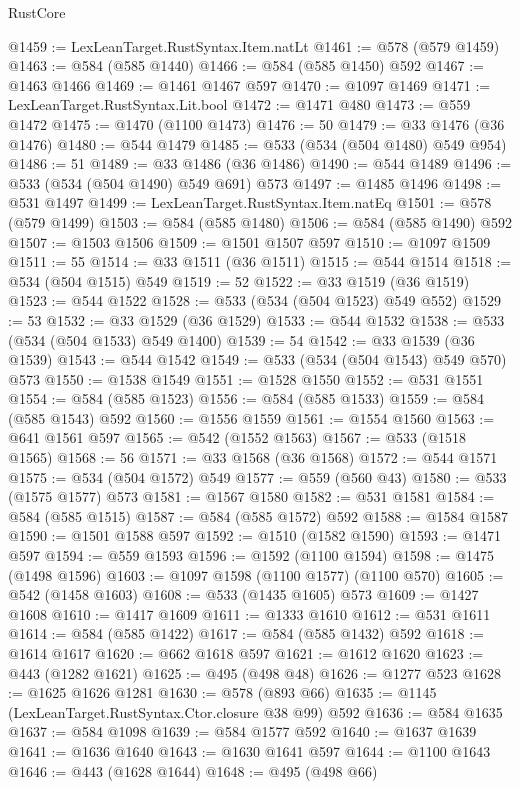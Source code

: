 \begin{lexlean}{RustCore}
\begin{coremodule}
@1459 := LexLeanTarget.RustSyntax.Item.natLt
@1461 := @578 (@579 @1459)
@1463 := @584 (@585 @1440)
@1466 := @584 (@585 @1450) @592
@1467 := @1463 @1466
@1469 := @1461 @1467 @597
@1470 := @1097 @1469
@1471 := LexLeanTarget.RustSyntax.Lit.bool
@1472 := @1471 @480
@1473 := @559 @1472
@1475 := @1470 (@1100 @1473)
@1476 := 50
@1479 := @33 @1476 (@36 @1476)
@1480 := @544 @1479
@1485 := @533 (@534 (@504 @1480) @549 @954)
@1486 := 51
@1489 := @33 @1486 (@36 @1486)
@1490 := @544 @1489
@1496 := @533 (@534 (@504 @1490) @549 @691) @573
@1497 := @1485 @1496
@1498 := @531 @1497
@1499 := LexLeanTarget.RustSyntax.Item.natEq
@1501 := @578 (@579 @1499)
@1503 := @584 (@585 @1480)
@1506 := @584 (@585 @1490) @592
@1507 := @1503 @1506
@1509 := @1501 @1507 @597
@1510 := @1097 @1509
@1511 := 55
@1514 := @33 @1511 (@36 @1511)
@1515 := @544 @1514
@1518 := @534 (@504 @1515) @549
@1519 := 52
@1522 := @33 @1519 (@36 @1519)
@1523 := @544 @1522
@1528 := @533 (@534 (@504 @1523) @549 @552)
@1529 := 53
@1532 := @33 @1529 (@36 @1529)
@1533 := @544 @1532
@1538 := @533 (@534 (@504 @1533) @549 @1400)
@1539 := 54
@1542 := @33 @1539 (@36 @1539)
@1543 := @544 @1542
@1549 := @533 (@534 (@504 @1543) @549 @570) @573
@1550 := @1538 @1549
@1551 := @1528 @1550
@1552 := @531 @1551
@1554 := @584 (@585 @1523)
@1556 := @584 (@585 @1533)
@1559 := @584 (@585 @1543) @592
@1560 := @1556 @1559
@1561 := @1554 @1560
@1563 := @641 @1561 @597
@1565 := @542 (@1552 @1563)
@1567 := @533 (@1518 @1565)
@1568 := 56
@1571 := @33 @1568 (@36 @1568)
@1572 := @544 @1571
@1575 := @534 (@504 @1572) @549
@1577 := @559 (@560 @43)
@1580 := @533 (@1575 @1577) @573
@1581 := @1567 @1580
@1582 := @531 @1581
@1584 := @584 (@585 @1515)
@1587 := @584 (@585 @1572) @592
@1588 := @1584 @1587
@1590 := @1501 @1588 @597
@1592 := @1510 (@1582 @1590)
@1593 := @1471 @597
@1594 := @559 @1593
@1596 := @1592 (@1100 @1594)
@1598 := @1475 (@1498 @1596)
@1603 := @1097 @1598 (@1100 @1577) (@1100 @570)
@1605 := @542 (@1458 @1603)
@1608 := @533 (@1435 @1605) @573
@1609 := @1427 @1608
@1610 := @1417 @1609
@1611 := @1333 @1610
@1612 := @531 @1611
@1614 := @584 (@585 @1422)
@1617 := @584 (@585 @1432) @592
@1618 := @1614 @1617
@1620 := @662 @1618 @597
@1621 := @1612 @1620
@1623 := @443 (@1282 @1621)
@1625 := @495 (@498 @48)
@1626 := @1277 @523
@1628 := @1625 @1626 @1281
@1630 := @578 (@893 @66)
@1635 := @1145 (LexLeanTarget.RustSyntax.Ctor.closure @38 @99) @592
@1636 := @584 @1635
@1637 := @584 @1098
@1639 := @584 @1577 @592
@1640 := @1637 @1639
@1641 := @1636 @1640
@1643 := @1630 @1641 @597
@1644 := @1100 @1643
@1646 := @443 (@1628 @1644)
@1648 := @495 (@498 @66)

\end{coremodule}
\end{lexlean}

